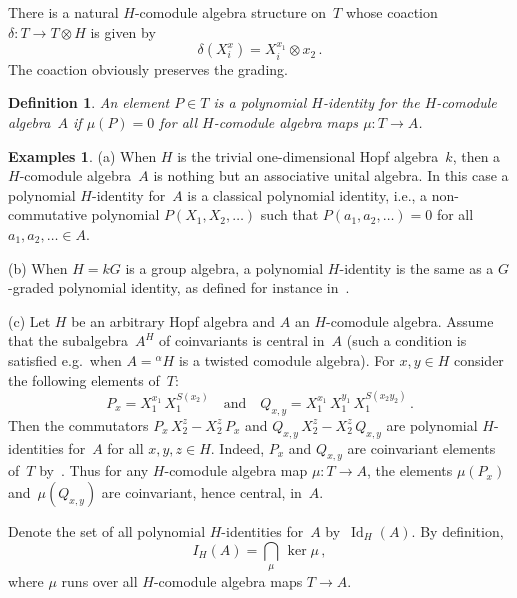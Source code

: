 \documentclass[11pt, a4paper]{amsart}
\newtheorem{definition}[theorem]{Definition}
\theoremstyle{definition}
\newtheorem{exas}[theorem]{Examples}
\numberwithin{equation}{section}
\begin{document}
There is a natural $H$-comodule algebra structure on~$T$ whose coaction $\delta : T \to T \otimes H$ is given by
\begin{equation*}\label{T-coaction}
\delta(X_i^x) = X_i^{x_1} \otimes x_2 \, .
\end{equation*}
The coaction obviously preserves the grading.

\begin{definition}
An element $P \in T$ is a polynomial $H$-identity for the $H$-comodule algebra~$A$
if $\mu(P) = 0$ for all $H$-comodule algebra maps $\mu : T \to A$.
\end{definition}

\begin{exas}
(a) When $H$ is the trivial one-dimensional Hopf algebra~$k$, then a $H$-comodule algebra~$A$
is nothing but an associative unital algebra.
In this case a polynomial $H$-identity for~$A$ is a classical polynomial identity, 
i.e., a non-commutative polynomial $P(X_1, X_2, \ldots)$
such that $P(a_1, a_2, \ldots) = 0$ for all $a_1, a_2, \ldots \in A$.

(b) When $H= kG$ is a group algebra, a polynomial $H$-identity is the same as a 
$G$-graded polynomial identity, as defined for instance in~\cite{BZ}.

(c) Let $H$ be an arbitrary Hopf algebra and $A$ an $H$-comodule algebra.
Assume that the subalgebra~$A^H$ of coinvariants is central in~$A$ 
(such a condition is satisfied e.g.\ when $A = {}^{\alpha} H$ is a twisted comodule algebra).
For $x,y \in H$ consider the following elements of~$T$:
\begin{equation*}
P_x = X_1^{x_1} \, X_1^{S(x_2)} 
\quad\text{and}\quad
Q_{x,y} = X_1^{x_1} \, X_1^{y_1} \, X_1^{S(x_2y_2)} \, .
\end{equation*}
Then the commutators
$P_x \, X_2^z - X_2^z \, P_x$ and $Q_{x,y} \, X_2^z - X_2^z \, Q_{x,y}$
are polynomial $H$-identities for~$A$ for all $x,y,z \in H$.
Indeed, $P_x$ and $Q_{x,y}$ are coinvariant elements of~$T$ by~\cite[Lem\-ma~2.1]{AK}.
Thus for any $H$-comodule algebra map $\mu : T \to A$,
the elements $\mu(P_x)$ and~$\mu(Q_{x,y})$ are coinvariant, hence central, in~$A$.
\end{exas}

Denote the set of all polynomial $H$-identities for~$A$ by~$\operatorname{Id}_H(A)$.
By definition,
\begin{equation*}\label{I(A)-def}
I_H(A) = \bigcap_{\mu}\, \ker \mu \, ,
\end{equation*}
where $\mu$ runs over all $H$-comodule algebra maps $T \to A$.
\end{document}
